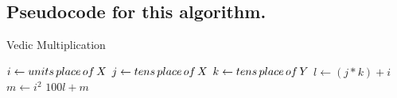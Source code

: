 \documentclass{article}
\begin{document}
\subsection{Pseudocode for this algorithm.}
\label{subsec7}
\begin{algorithm}
   \caption{Vedic Multiplication}
    \begin{algorithmic}[h]

        \State $i \gets units \thinspace place \thinspace of \thinspace X $
        \State $j \gets tens \thinspace place \thinspace of \thinspace X $
        \State $k \gets tens \thinspace place \thinspace of \thinspace Y $
        \State $l \gets (j*k)+i$
        \State $m \gets i^2$
        \newline
        \Return $100l+m$
       \EndFunction
\end{algorithmic}
\end{algorithm}
\end{document}
